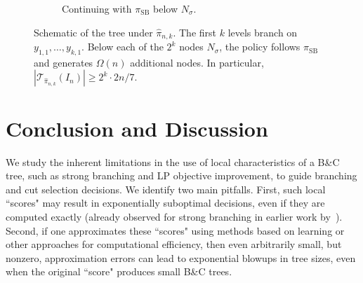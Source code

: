 \documentclass[smallextended,envcountsect]{svjour3} %
\newcommand{\Tcal}{\mathcal{T}}
\newcommand{\0}{\mathbf{0}}
\newcommand{\1}{\mathbf{1}} %
\begin{document}
\begin{figure}[htbp]
\begin{subfigure}[t]{\linewidth}
\caption{Continuing with $\pi_{\mathrm{SB}}$ below $N_\sigma$.}
\end{subfigure}
\caption{Schematic of the tree under $\hat\pi_{n,k}$. The first $k$ levels branch on $y_{1,1},\dots,y_{k,1}$. Below each of the $2^k$ nodes $N_\sigma$, the policy follows $\pi_{\mathrm{SB}}$ and generates $\Omega(n)$ additional nodes. In particular, $|\Tcal_{\hat\pi_{n,k}}(I_n)|\ge 2^k\cdot 2n/7$.}
\label{fig:hat_tree_schematic}
\end{figure}

\section{Conclusion and Discussion}
\label{sec:conclusion}

We study the inherent limitations in the use of local characteristics of a B\&C tree, such as strong branching and LP objective improvement, to guide branching and cut selection decisions. We identify two main pitfalls. First, such local ``scores" may result in exponentially suboptimal decisions, even if they are computed exactly (already observed for strong branching in earlier work by~\cite{dey2024theoretical}). Second, if one approximates these ``scores" using methods based on learning or other approaches for computational efficiency, then even arbitrarily small, but nonzero, approximation errors can lead to exponential blowups in tree sizes, even when the original ``score" produces small B\&C trees.


\end{document}
